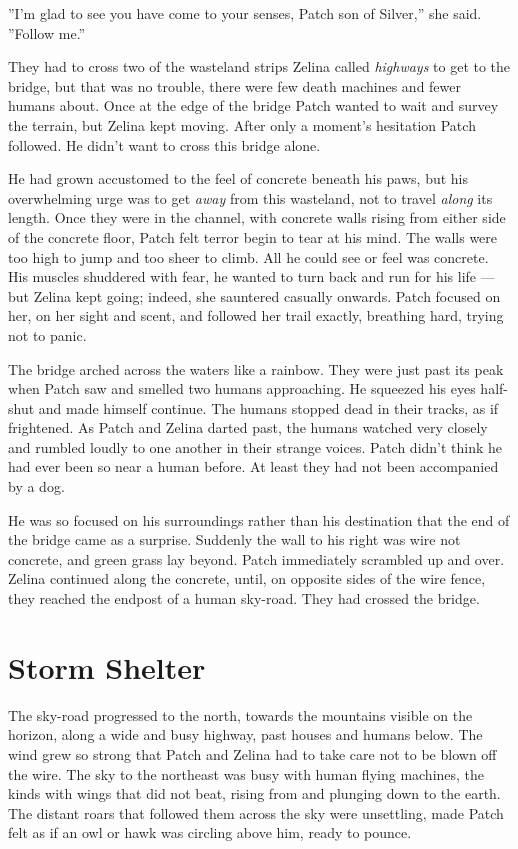 \documentclass[12pt]{book}
\begin{document}
''I'm glad to see you have come to your senses, Patch son of Silver,''
she said. ''Follow me.''

They had to cross two of the wasteland strips Zelina called
\textit{highways} to get to the bridge, but that was no trouble, there
were few death machines and fewer humans about. Once at the edge of
the bridge Patch wanted to wait and survey the terrain, but Zelina
kept moving. After only a moment's hesitation Patch followed. He
didn't want to cross this bridge alone.

He had grown accustomed to the feel of concrete beneath his paws, but
his overwhelming urge was to get \textit{away} from this wasteland,
not to travel \textit{along} its length. Once they were in the
channel, with concrete walls rising from either side of the concrete
floor, Patch felt terror begin to tear at his mind. The walls were too
high to jump and too sheer to climb. All he could see or feel was
concrete. His muscles shuddered with fear, he wanted to turn back and
run for his life --- but Zelina kept going; indeed, she sauntered
casually onwards. Patch focused on her, on her sight and scent, and
followed her trail exactly, breathing hard, trying not to panic.

The bridge arched across the waters like a rainbow. They were just
past its peak when Patch saw and smelled two humans approaching. He
squeezed his eyes half-shut and made himself continue. The humans
stopped dead in their tracks, as if frightened. As Patch and Zelina
darted past, the humans watched very closely and rumbled loudly to one
another in their strange voices. Patch didn't think he had ever been
so near a human before. At least they had not been accompanied by a
dog.

He was so focused on his surroundings rather than his destination that
the end of the bridge came as a surprise. Suddenly the wall to his
right was wire not concrete, and green grass lay beyond. Patch
immediately scrambled up and over. Zelina continued along the
concrete, until, on opposite sides of the wire fence, they reached the
endpost of a human sky-road. They had crossed the bridge.


\section{Storm Shelter}

The sky-road progressed to the north, towards the mountains visible on
the horizon, along a wide and busy highway, past houses and humans
below. The wind grew so strong that Patch and Zelina had to take care
not to be blown off the wire. The sky to the northeast was busy with
human flying machines, the kinds with wings that did not beat, rising
from and plunging down to the earth. The distant roars that followed
them across the sky were unsettling, made Patch felt as if an owl or
hawk was circling above him, ready to pounce.
\end{document}
